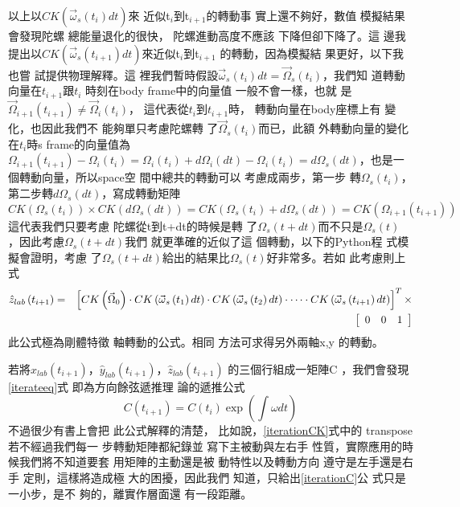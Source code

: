 \documentclass[12pt,a4paper]{article}
\begin{document}
以上以$CK\left( \vec{\omega}_{s}(t_{i})dt\right) $來%
近似t$_{i}$到t$_{i+1}$的轉動事%
實上還不夠好，數值%
模擬結果會發現陀螺%
總能量退化的很快，%
陀螺進動高度不應該%
下降但卻下降了。這%
邊我提出以$CK\left( \vec{\omega}%
_{s}(t_{i+1})dt\right) $來近似t$_{i}$到t$_{i+1}$%
的轉動，因為模擬結%
果更好，以下我也嘗%
試提供物理解釋。這%
裡我們暫時假設$\vec{\omega}%
_{s}(t_{i})dt=\vec{\Omega}_{s}(t_{i})$，我們知%
道轉動向量在$t_{i+1}$跟$t_{i}$%
時刻在body frame中的向量值%
一般不會一樣，也就%
是$\vec{\Omega}_{i+1}(t_{i+1})\neq \vec{\Omega}_{i}(t_{i})$，%
這代表從$t_{i}$到$t_{i+1}$時，%
轉動向量在body座標上有%
變化，也因此我們不%
能夠單只考慮陀螺轉%
了$\vec{\Omega}_{s}(t_{i})$而已，此額%
外轉動向量的變化在$%
t_{i}$時s frame的向量值為$\Omega
_{i+1}(t_{i+1})-\Omega _{i}(t_{i})=\Omega _{i}(t_{i})+d\Omega
_{i}(dt)-\Omega _{i}(t_{i})=d\Omega _{s}(dt)$，也是一%
個轉動向量，所以space空%
間中總共的轉動可以%
考慮成兩步，第一步%
轉$\Omega _{s}(t_{i})$，第二步轉$d\Omega
_{s}(dt)$，寫成轉動矩陣%
\begin{equation}
CK(\Omega _{s}(t_{i}))\times CK(d\Omega _{s}(dt))=CK(\Omega
_{s}(t_{i})+d\Omega _{s}(dt))=CK(\Omega _{i+1}(t_{i+1}))
\end{equation}%
這代表我們只要考慮%
陀螺從t到t+dt的時候是轉%
了$\Omega _{s}(t+dt)$而不只是$\Omega _{s}(t)$%
，因此考慮$\Omega _{s}(t+dt)$我們%
就更準確的近似了這%
個轉動，以下的Python程%
式模擬會證明，考慮%
了$\Omega _{s}(t+dt)$給出的結果比$%
\Omega _{s}(t)$好非常多。若如%
此考慮則上式%
\begin{eqnarray}
\hat{z}_{lab}\left( t_{i+1}\right) &=&\left[ CK\left( \vec{\Omega}%
_{0}\right) \cdot CK\left( \vec{\omega}_{s}\left( t_{1}\right) dt\right)
\cdot CK\left( \vec{\omega}_{s}\left( t_{2}\right) dt\right) \cdot \cdots
\cdot CK\left( \vec{\omega}_{s}\left( t_{i+1}\right) dt\right) \right]
^{T}\times  \notag \\
&&\left[ 
\begin{array}{ccc}
0 & 0 & 1%
\end{array}%
\right]  \label{iterationCK}
\end{eqnarray}%
此公式極為剛體特徵%
軸轉動的公式。相同%
方法可求得另外兩軸x,y%
的轉動。

若將$\hat{x}_{lab}\left( t_{i+1}\right) $，$\hat{y}%
_{lab}\left( t_{i+1}\right) $，$\hat{z}_{lab}\left( t_{i+1}\right) $%
的三個行組成一矩陣C%
，我們會發現\ref{iterateeq}式%
即為方向餘弦遞推理%
論的遞推公式\cite{titterton}%
\begin{equation}
C(t_{i+1})=C(t_{i})\exp (\int \omega dt)  \label{iterationC}
\end{equation}%
不過很少有書上會把%
此公式解釋的清楚，%
比如說，\ref{iterationCK}式中的%
transpose若不經過我們每一%
步轉動矩陣都紀錄並%
寫下主被動與左右手%
性質，實際應用的時%
候我們將不知道要套%
用矩陣的主動還是被%
動特性以及轉動方向%
遵守是左手還是右手%
定則，這樣將造成極%
大的困擾，因此我們%
知道，只給出\ref{iterationC}公%
式只是一小步，是不%
夠的，離實作層面還%
有一段距離。
\end{document}
